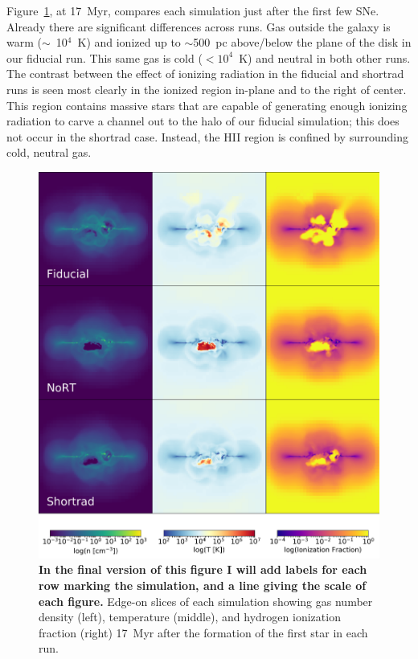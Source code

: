 \documentclass[twocolumn]{aastex62}
\begin{document}
Figure~\ref{fig:panel1}, at 17~Myr, compares each simulation just after the first few SNe. Already there are significant differences across runs. Gas outside the galaxy is warm ($\sim$~10$^{4}$~K) and ionized up to $\sim$500~pc above/below the plane of the disk in our fiducial run. This same gas is cold ($<10^4$~K) and neutral in both other runs. The contrast between the effect of ionizing radiation in the fiducial and shortrad runs is seen most clearly in the ionized region in-plane and to the right of center. This region contains massive stars that are capable of generating enough ionizing radiation to carve a channel out to the halo of our fiducial simulation; this does not occur in the shortrad case. Instead, the HII region is confined by surrounding cold, neutral gas. 

\begin{figure}
\centering
\includegraphics[width=0.99\linewidth]{DD0136_fiducial_shortrad_nort}
\caption{\textbf{In the final version of this figure I will add labels for each row marking the simulation, and a line giving the scale of each figure.} Edge-on slices of each simulation showing gas number density (left), temperature (middle), and hydrogen ionization fraction (right) 17~Myr after the formation of the first star in each run.}
\label{fig:panel1}
\end{figure}
\end{document}
